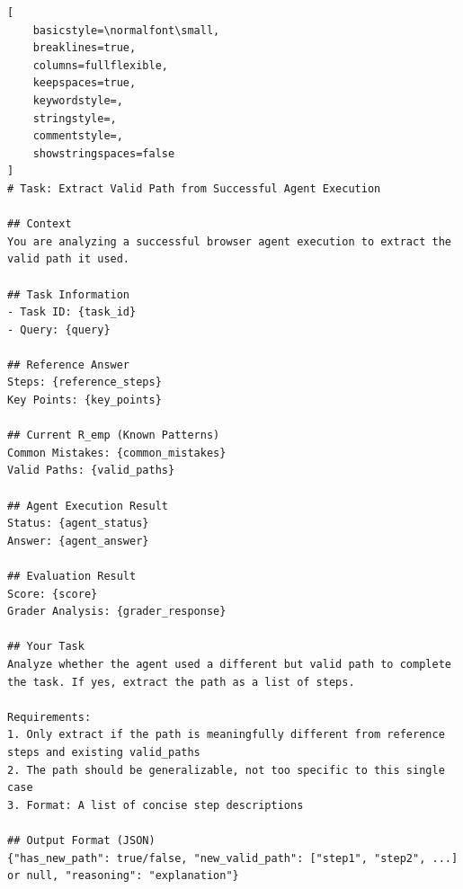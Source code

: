 \begin{tcolorbox}[
  title={Success Case $\rightarrow$ Extract \texttt{valid\_path}},
  colback=white,
  colframe=tableblueTitle,
  colbacktitle=tableblueTitle,
  coltitle=white,
  fonttitle=\bfseries,
  breakable,
  enhanced,
  boxrule=1.2pt,
  arc=1.5mm
]
\begin{lstlisting}[
    basicstyle=\normalfont\small,
    breaklines=true,
    columns=fullflexible,
    keepspaces=true,
    keywordstyle=,
    stringstyle=,
    commentstyle=,
    showstringspaces=false
]
# Task: Extract Valid Path from Successful Agent Execution

## Context
You are analyzing a successful browser agent execution to extract the valid path it used.

## Task Information
- Task ID: {task_id}
- Query: {query}

## Reference Answer
Steps: {reference_steps}
Key Points: {key_points}

## Current R_emp (Known Patterns)
Common Mistakes: {common_mistakes}
Valid Paths: {valid_paths}

## Agent Execution Result
Status: {agent_status}
Answer: {agent_answer}

## Evaluation Result
Score: {score}
Grader Analysis: {grader_response}

## Your Task
Analyze whether the agent used a different but valid path to complete the task. If yes, extract the path as a list of steps.

Requirements:
1. Only extract if the path is meaningfully different from reference steps and existing valid_paths
2. The path should be generalizable, not too specific to this single case
3. Format: A list of concise step descriptions

## Output Format (JSON)
{"has_new_path": true/false, "new_valid_path": ["step1", "step2", ...] or null, "reasoning": "explanation"}
\end{lstlisting}
\end{tcolorbox}

